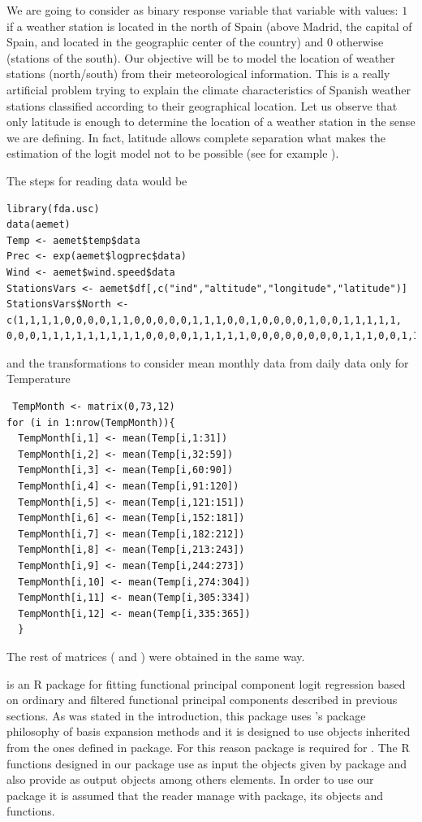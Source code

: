 We are going to consider as binary response variable that variable with values: $1$ if a weather station is located in the north of Spain (above Madrid, the capital of Spain, and located in the geographic center of the country) and $0$ otherwise (stations of the south). Our objective will be to model the location of weather stations (north/south) from their meteorological information. This is a really artificial problem trying to explain the climate characteristics of Spanish weather stations classified according to their geographical location. Let us observe that only latitude is enough to determine the location of a weather station in the sense we are defining. In fact, latitude allows complete separation what makes the estimation of the logit model not to be possible (see for example \cite{Hosmer13}). 

The steps for reading data would be

\begin{verbatim}
library(fda.usc)
data(aemet)
Temp <- aemet$temp$data
Prec <- exp(aemet$logprec$data)
Wind <- aemet$wind.speed$data
StationsVars <- aemet$df[,c("ind","altitude","longitude","latitude")]
StationsVars$North <- c(1,1,1,1,0,0,0,0,1,1,0,0,0,0,0,1,1,1,0,0,1,0,0,0,0,1,0,0,1,1,1,1,1,
0,0,0,1,1,1,1,1,1,1,1,1,0,0,0,0,1,1,1,1,1,0,0,0,0,0,0,0,0,1,1,1,0,0,1,1,1,1,1,1)
\end{verbatim}

\noindent and the transformations to consider mean monthly data from daily data only for Temperature

\begin{verbatim}
 TempMonth <- matrix(0,73,12)
for (i in 1:nrow(TempMonth)){
  TempMonth[i,1] <- mean(Temp[i,1:31])
  TempMonth[i,2] <- mean(Temp[i,32:59])
  TempMonth[i,3] <- mean(Temp[i,60:90])
  TempMonth[i,4] <- mean(Temp[i,91:120])
  TempMonth[i,5] <- mean(Temp[i,121:151])
  TempMonth[i,6] <- mean(Temp[i,152:181])
  TempMonth[i,7] <- mean(Temp[i,182:212])
  TempMonth[i,8] <- mean(Temp[i,213:243])
  TempMonth[i,9] <- mean(Temp[i,244:273])
  TempMonth[i,10] <- mean(Temp[i,274:304])
  TempMonth[i,11] <- mean(Temp[i,305:334])
  TempMonth[i,12] <- mean(Temp[i,335:365])
  }
\end{verbatim}

The rest of matrices ( and ) were obtained in the same way.

 is an R package for fitting functional principal component logit regression based on ordinary and filtered functional principal components described in previous sections. As was stated in the introduction, this package uses 's package philosophy of basis expansion methods and it is designed to use objects inherited from the ones defined in  package. For this reason  package is required for . The R functions designed in our package use as input the  objects given by  package and also provide as output  objects among others elements. In order to use our package it is assumed that the reader manage with  package, its objects and functions. 

